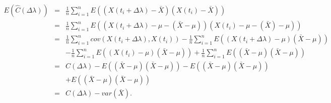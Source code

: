 \begin{eqnarray}
	\nonumber
	E(\hat{C}(\Delta \lambda)) &=& \frac{1}{n}\sum_{i = 1}^n E((X(t_i + \Delta \lambda) - \bar{X})(X(t_i) - \bar{X})) \\ \nonumber
	&=& \frac{1}{n}\sum_{i = 1}^n E((X(t_i + \Delta \lambda) - \mu - (\bar{X} - \mu))(X(t_i) -\mu - (\bar{X}) - \mu)) \\ \nonumber
	&=& \frac{1}{n}\sum_{i=1}^n cov(X(t_i+\Delta \lambda), X(t_i)) - \frac{1}{n}\sum_{i = 1}^n E((X(t_i + \Delta \lambda) - \mu)(\bar{X} - \mu)) \\ \nonumber
	& & -\frac{1}{n}\sum_{i = 1}^n E((X(t_i) - \mu)(\bar{X} - \mu)) + \frac{1}{n}\sum_{i = 1}^n E((\bar{X} - \mu)(\bar{X} - \mu)) \\ \nonumber
	&=& C(\Delta \lambda) -E((\bar{X} - \mu)(\bar{X} - \mu)) - E((\bar{X} - \mu)(\bar{X} - \mu)) \\ \nonumber 
	& & + E((\bar{X} - \mu)(\bar{X} - \mu)) \\ \nonumber
	&=& C(\Delta \lambda) - var(\bar{X}).
\end{eqnarray}

% 
% 
% 
% 
% 
% 
% 



